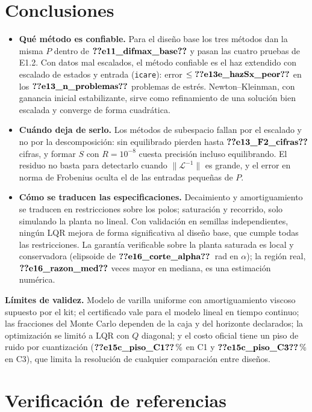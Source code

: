 \documentclass[11pt,a4paper]{article}
\begin{document}
\section{Conclusiones}
\begin{itemize}
\item \textbf{Qué método es confiable.} Para el diseño base los tres métodos dan la misma $P$ dentro de
$\V{e11_difmax_base}$ y pasan las cuatro pruebas de E1.2. Con datos mal escalados, el método confiable es el haz
extendido con escalado de estados y entrada (\texttt{icare}): error $\le\V{e13e_hazSx_peor}$ en los
$\V{e13_n_problemas}$ problemas de estrés. Newton--Kleinman, con ganancia inicial estabilizante, sirve como
refinamiento de una solución bien escalada y converge de forma cuadrática.
\item \textbf{Cuándo deja de serlo.} Los métodos de subespacio fallan por el escalado y no por la
descomposición: sin equilibrado pierden hasta $\V{e13_F2_cifras}$ cifras, y formar $S$ con $R=10^{-8}$ cuesta precisión
incluso equilibrando. El residuo no basta para detectarlo cuando $\|\mathcal L^{-1}\|$ es grande, y el error en norma
de Frobenius oculta el de las entradas pequeñas de $P$.
\item \textbf{Cómo se traducen las especificaciones.} Decaimiento y amortiguamiento se traducen en restricciones
sobre los polos; saturación y recorrido, solo simulando la planta no lineal. Con validación en semillas
independientes, ningún LQR mejora de forma significativa al diseño base, que cumple todas las restricciones. La
garantía verificable sobre la planta saturada es local y conservadora (elipsoide de $\V{e16_corte_alpha}$~rad en
$\alpha$); la región real, $\V{e16_razon_med}$ veces mayor en mediana, es una estimación numérica.
\end{itemize}
\textbf{Límites de validez.} Modelo de varilla uniforme con amortiguamiento viscoso supuesto por el kit; el
certificado vale para el modelo lineal en tiempo continuo; las fracciones del Monte Carlo dependen de la caja y del
horizonte declarados; la optimización se limitó a LQR con $Q$ diagonal; y el costo oficial tiene un piso de ruido por
cuantización ($\V{e15c_piso_C1}\,\%$ en C1 y $\V{e15c_piso_C3}\,\%$ en C3), que limita la resolución de cualquier comparación entre diseños.


{\small}

\clearpage
\appendix



\section{Verificación de referencias}

\end{document}
